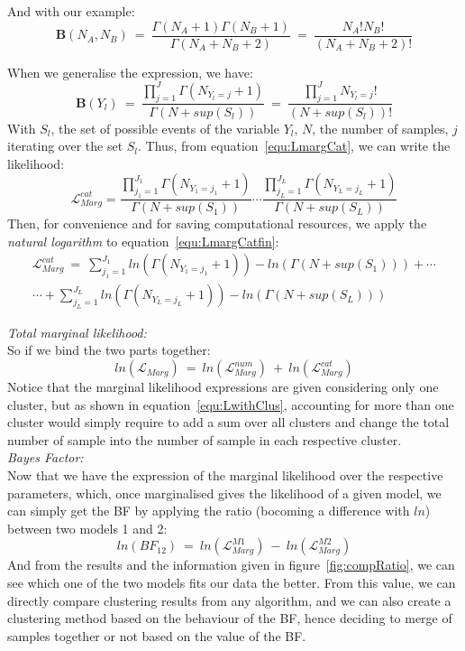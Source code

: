 \documentclass[twocolumn]{article}
\begin{document}
And with our example:\\
$$\textbf{B}(N_A,N_B)\ =\ \frac{\Gamma(N_A+1)\Gamma(N_B+1)}{\Gamma(N_A+N_B+2)}\ =\ \frac{N_A!N_B!}{(N_A+N_B+2)!}$$


When we generalise the expression, we have:
\begin{equation}
    \textbf{B}(Y_l)\ =\ \frac{\prod_{j=1}^J\Gamma(N_{Y_l=j}+1)}{\Gamma(N+sup(S_l))}\ =\ \frac{\prod_{j=1}^JN_{Y_l=j}!}{(N+sup(S_l))!}
\end{equation}
With $S_l$, the set of possible events of the variable $Y_l$, $N$, the number of samples, $j$ iterating over the set $S_l$.
Thus, from equation~\ref{equ:LmargCat}, we can write the likelihood:
\small{
\begin{equation}
     \mathcal{L}_{Marg}^{cat} = \frac{\prod_{j_1=1}^{J_1}\Gamma(N_{Y_1=j_1}+1)}{\Gamma(N+sup(S_1))}\cdots\frac{\prod_{j_L=1}^{J_L}\Gamma(N_{Y_L=j_L}+1)}{\Gamma(N+sup(S_L))}
     \label{equ:LmargCatfin}
\end{equation}
}
Then, for convenience and for saving computational resources, we apply the \emph{natural logarithm} to equation~\ref{equ:LmargCatfin}:
\small
\begin{align}
    \mathcal{L}_{Marg}^{cat}\ =\ \sum_{j_1=1}^{J_1}ln(\Gamma(N_{Y_1=j_1}+1))-ln(\Gamma(N+sup(S_1)))+\cdots\nonumber\\
 \cdots+\sum_{j_L=1}^{J_L}ln(\Gamma(N_{Y_L=j_L}+1))-ln(\Gamma(N+sup(S_L))) 
\end{align}

\emph{Total marginal likelihood:}\\
So if we bind the two parts together:
\begin{equation}
    ln(\mathcal{L}_{Marg})\ =\  ln(\mathcal{L}_{Marg}^{num})\ +\ ln(\mathcal{L}_{Marg}^{cat})
    \label{equ:finalLmargTot}
\end{equation}
Notice that the marginal likelihood expressions are given considering only one cluster, but as shown in equation~\ref{equ:LwithClus}, accounting for more than one cluster would simply require to add a sum over all clusters and change the total number of sample into the number of sample in each respective cluster.\\

\emph{Bayes Factor:}\\
Now that we have the expression of the marginal likelihood over the respective parameters, which, once marginalised gives the likelihood of a given model, we can simply get the BF by applying the ratio (bocoming a difference with $ln$) between two models 1 and 2:
\begin{equation}
    ln(BF_{12})\ =\ ln(\mathcal{L}_{Marg}^{M1})\ -\ ln(\mathcal{L}_{Marg}^{M2})
    \label{equ:lnLikeBF}
\end{equation}
And from the results and the information given in figure~\ref{fig:compRatio}, we can see which one of the two models fits our data the better.
From this value, we can directly compare clustering results from any algorithm, and we can also create a clustering method based on the behaviour of the BF, hence deciding to merge of samples together or not based on the value of the BF.
\end{document}
